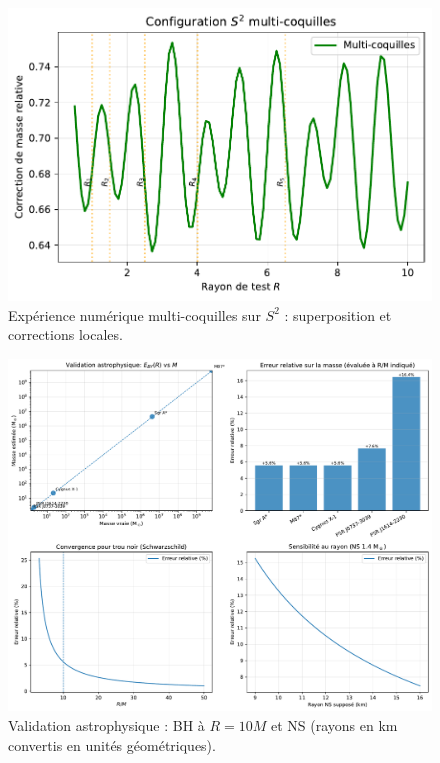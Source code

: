 \documentclass[11pt,a4paper]{article}
\theoremstyle{remark}
\begin{document}
\begin{figure}[htbp]
  \centering
  \includegraphics[width=\linewidth]{fig_sphere_multishell.pdf}
  \caption{Expérience numérique multi-coquilles sur $S^2$ : superposition et corrections locales.}
  \label{fig:fig_sphere_multishell}
\end{figure}

\begin{figure}[htbp]
  \centering
  \includegraphics[width=\linewidth]{fig_astrophysical_validation.pdf}
  \caption{Validation astrophysique : BH à $R=10M$ et NS (rayons en km convertis en unités géométriques).}
  \label{fig:fig_astrophysical_validation}
\end{figure}
\end{document}

